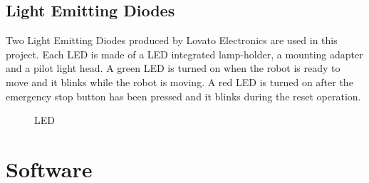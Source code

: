 \subsection{Light Emitting Diodes}
Two Light Emitting Diodes produced by Lovato Electronics are used in this project. Each LED is made of a LED integrated lamp-holder, a mounting adapter and a pilot light head.
A green LED is turned on when the robot is ready to move and it blinks while the robot is moving.
A red LED is turned on after the emergency stop button has been pressed and it blinks during the reset operation.
\begin{figure}[!h]
\centering
{}
\qquad
{}
\qquad
{}
\caption{LED}
\label{fig:led}
\end{figure}

\section{Software}

